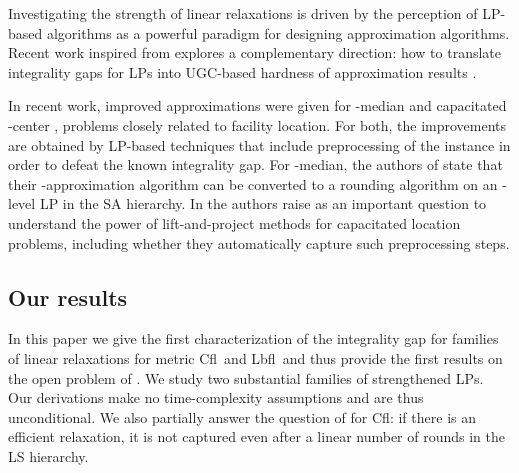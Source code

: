 \documentclass[11pt]{article}\usepackage{amsmath}
\newcommand{\lbfl}{{\sc Lbfl}}
\newcommand{\cfl}{{\sc Cfl}}
\begin{document}
Investigating the strength  of linear relaxations  is driven by the 
perception of LP-based algorithms as a  powerful paradigm for designing
approximation algorithms. 
Recent work inspired from 
\cite{Raghavendra08} 
explores a complementary direction: how to translate integrality gaps for LPs into {\sf UGC}-based
hardness of approximation results \cite{KumarMTV11}. 


In  recent work,  improved  approximations  were given  for
-median   \cite{LiS13}      and   capacitated   -center
\cite{CyganHK12,AnBS13},  problems closely  related to
facility location.  For both, the improvements are obtained 
by LP-based techniques
that  include preprocessing  of the  instance in  order to  defeat the
known integrality gap. For -median, the authors of \cite{LiS13}
state that their 
-approximation algorithm   can
be converted  to a  rounding algorithm on an 
 -level LP  in the SA hierarchy.  In \cite{AnBS13}
the authors raise as an important question  to understand  the
power  of lift-and-project methods  for capacitated  location
problems, including  whether they 
automatically capture such preprocessing steps. 




\subsection{Our results}
In this paper we give the first characterization  of 
 the    integrality gap  for families of 
 linear relaxations  for metric \cfl\ and \lbfl\  and thus provide the
 first results on the open problem of \cite{ShmoysWbook}. 
We study two substantial families of
strengthened LPs. 
Our derivations make  no time-complexity assumptions 
and are thus unconditional.  We also partially  answer 
the question of \cite{AnBS13} for \cfl:  if there is an efficient relaxation, 
it is not captured even after a linear number of rounds in
the LS hierarchy.  
\end{document}
